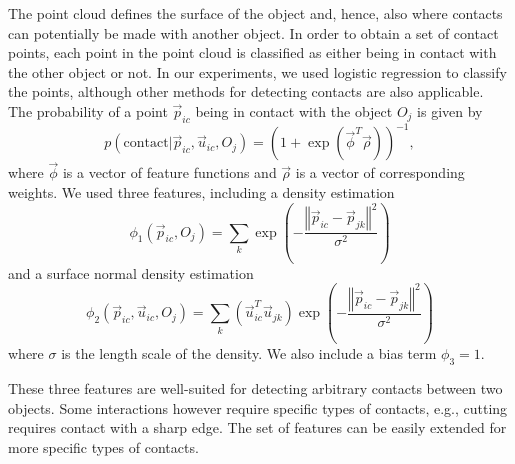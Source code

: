 The point cloud defines the surface of the object and, hence, also
where contacts can potentially be made with another object. In order
to obtain a set of contact points, each point in the point cloud is
classified as either being in contact with the other object or not.
In our experiments, we used logistic regression to classify the points, although 
other methods for detecting contacts are also applicable.
The probability of a point $\vec{p}_{ic}$ being in contact with the
object $O_{j}$ is given by 
\[
p(\text{contact}|\vec{p}_{ic},\vec{u}_{ic},O_{j})=\left(1+\exp\left(\vec{\phi}^{T}\vec{\rho}\right)\right)^{-1},
\]
where $\vec{\phi}$ is a vector of feature functions and $\vec{\rho}$
is a vector of corresponding weights. We used three features, including
a density estimation
\[
\phi_{1}(\vec{p}_{ic},O_{j})=\sum_{k}\exp\left(-\frac{\left\Vert \vec{p}_{ic}-\vec{p}_{jk}\right\Vert ^{2}}{\sigma^{2}}\right)
\]
and a surface normal density estimation 
\[
\phi_{2}(\vec{p}_{ic},\vec{u}_{ic},O_{j})=\sum_{k}(\vec{u}_{ic}^{T}\vec{u}_{jk})\exp\left(-\frac{\left\Vert \vec{p}_{ic}-\vec{p}_{jk}\right\Vert ^{2}}{\sigma^{2}}\right)
\]
where $\sigma$ is the length scale of the density. We also include
a bias term $\phi_{3}=1$. 

These three features are well-suited for detecting arbitrary contacts between two objects.
Some interactions however require specific types of contacts, e.g., cutting requires contact with a sharp edge. The set of features can be easily extended for more specific types of contacts. 



